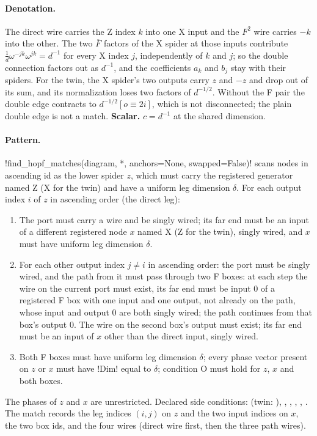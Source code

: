 \paragraph{Denotation.} The direct wire carries the Z index $k$ into one X input and the $F^2$ wire carries $-k$ into the other. The two $\overline F$ factors of the X spider at those inputs contribute $\frac1d\omega^{-jk}\omega^{jk}=d^{-1}$ for every X index $j$, independently of $k$ and $j$; so the double connection factors out as $d^{-1}$, and the coefficients $a_k$ and $b_j$ stay with their spiders. For the twin, the X spider's two outputs carry $z$ and $-z$ and drop out of its sum, and its normalization loses two factors of $d^{-1/2}$. Without the F pair the double edge contracts to $d^{-1/2}[o\equiv2i]$, which is not disconnected; the plain double edge is not a match. \textbf{Scalar.} $c=d^{-1}$ at the shared dimension.

\paragraph{Pattern.} \py!find_hopf_matches(diagram, *, anchors=None, swapped=False)! scans nodes in ascending id as the lower spider $z$, which must carry the registered generator named Z (X for the twin) and have a uniform leg dimension $\delta$. For each output index $i$ of $z$ in ascending order (the direct leg):
\begin{enumerate}
\item The port must carry a wire and be singly wired; its far end must be an input of a different registered node $x$ named X (Z for the twin), singly wired, and $x$ must have uniform leg dimension $\delta$.
\item For each other output index $j\ne i$ in ascending order: the port must be singly wired, and the path from it must pass through two F boxes: at each step the wire on the current port must exist, its far end must be input 0 of a registered F box with one input and one output, not already on the path, whose input and output 0 are both singly wired; the path continues from that box's output 0. The wire on the second box's output must exist; its far end must be an input of $x$ other than the direct input, singly wired.
\item Both F boxes must have uniform leg dimension $\delta$; every phase vector present on $z$ or $x$ must have \py!Dim! equal to $\delta$; condition O must hold for $z$, $x$ and both boxes.
\end{enumerate}
The phases of $z$ and $x$ are unrestricted. Declared side conditions:  (twin: ), , , , , . The match records the leg indices $(i,j)$ on $z$ and the two input indices on $x$, the two box ids, and the four wires (direct wire first, then the three path wires).

